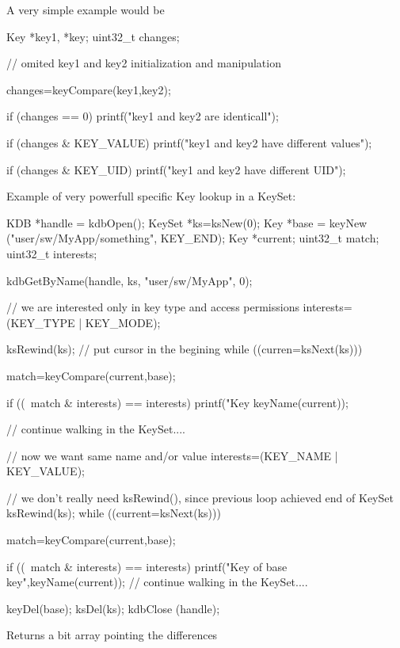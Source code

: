 \begin{DoxyParagraph}{A very simple example would be}

\begin{DoxyCode}
Key *key1, *key;
uint32_t changes;

// omited key1 and key2 initialization and manipulation

changes=keyCompare(key1,key2);

if (changes == 0) printf("key1 and key2 are identicall\n");

if (changes & KEY_VALUE)
        printf("key1 and key2 have different values\n");
 
if (changes & KEY_UID)
        printf("key1 and key2 have different UID\n");
\end{DoxyCode}

\end{DoxyParagraph}
\begin{DoxyParagraph}{Example of very powerfull specific Key lookup in a KeySet:}

\begin{DoxyCode}
KDB *handle = kdbOpen();
KeySet *ks=ksNew(0);
Key *base = keyNew ("user/sw/MyApp/something", KEY_END);
Key *current;
uint32_t match;
uint32_t interests;


kdbGetByName(handle, ks, "user/sw/MyApp", 0);

// we are interested only in key type and access permissions
interests=(KEY_TYPE | KEY_MODE);

ksRewind(ks);   // put cursor in the begining
while ((curren=ksNext(ks))) {
        match=keyCompare(current,base);
        
        if ((~match & interests) == interests)
                printf("Key %
      keyName(current));

        // continue walking in the KeySet....
}

// now we want same name and/or value
interests=(KEY_NAME | KEY_VALUE);

// we don't really need ksRewind(), since previous loop achieved end of KeySet
ksRewind(ks);
while ((current=ksNext(ks))) {
        match=keyCompare(current,base);

        if ((~match & interests) == interests) {
                printf("Key %
                        of base key",keyName(current));
        }
        // continue walking in the KeySet....
}

keyDel(base);
ksDel(ks);
kdbClose (handle);
\end{DoxyCode}

\end{DoxyParagraph}
\begin{DoxyReturn}{Returns}
a bit array pointing the differences 
\end{DoxyReturn}


